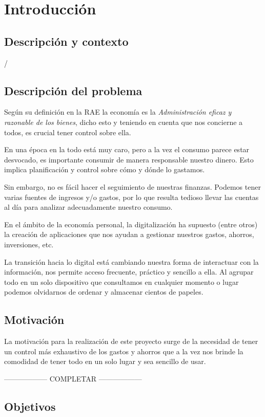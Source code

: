 \chapter{Introducción}
\section{Descripción y contexto} / \section{Descripción del problema}

Según su definición en la RAE la economía\cite{economía} es la 
\textit{Administración eficaz y razonable de los bienes}, dicho esto y teniendo en 
cuenta que nos concierne a todos, es crucial tener control sobre ella. 

En una época en la todo está muy caro, pero a la vez el consumo parece estar 
desvocado, es importante consumir de manera responsable nuestro dinero. Esto 
implica planificación y control sobre cómo y dónde lo gastamos.

Sin embargo, no es fácil hacer el seguimiento de nuestras finanzas. Podemos tener 
varias fuentes de ingresos y/o gastos, por lo que resulta tedioso 
llevar las cuentas al día para analizar adecuadamente nuestro consumo. 

En el ámbito de la economía personal, la digitalización ha supuesto (entre 
otros) la creación de aplicaciones que nos ayudan a gestionar nuestros 
gastos, ahorros, inversiones, etc.

La transición hacia lo digital está cambiando nuestra forma de interactuar con 
la información, nos permite acceso frecuente, práctico y sencillo a ella.
Al agrupar todo en un solo dispositivo que consultamos en cualquier momento o 
lugar podemos olvidarnos de ordenar y almacenar cientos de papeles.

\section{Motivación}
La motivación para la realización de este proyecto surge de la necesidad de 
tener un control más exhaustivo de los gastos y ahorros que a la vez nos brinde 
la comodidad de tener todo en un solo lugar y sea sencillo de usar.

------------------ COMPLETAR ------------------


\section{Objetivos} \label{sect:goals}
